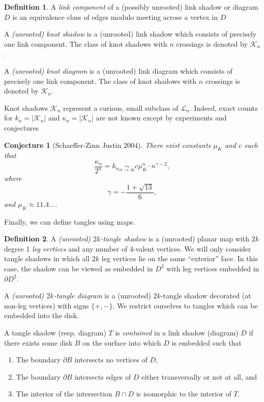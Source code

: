 \documentclass[amsmath,longbibliography,secnumarabic,floatfix,amssymb,nofootinbib,nobibnotes,letterpaper,11pt,tightenlines,notitlepage,showkeys,showlabels]{amsart}%
\newcommand{\KnotDia}{\mathcal{K}}
\newcommand{\knotdia}{\kappa}
\newcommand{\FlatKnotDia}{\mathscr{K}}
\newcommand{\KnotShad}{\FlatKnotDia}
\newcommand{\knotshad}{k}
\newcommand{\knotgrowth}{\mu_K}
\newcommand{\LinkShad}{\mathscr{L}}
\newtheorem*{conjecture}{Conjecture}
\theoremstyle{definition}
\newtheorem*{definition}{Definition}
\begin{document}
\begin{definition} 
  A \emph{link component} of a (possibly unrooted) link shadow or
  diagram $D$ is an equivalence class of edges modulo meeting across a
  vertex in $D$

  A \emph{(unrooted) knot shadow} is a (unrooted) link shadow which
  consists of precisely one link component. The class of knot
  shadows with $n$ crossings is denoted by $\KnotShad_n$.

  A \emph{(unrooted) knot diagram} is a (unrooted) link diagram which
  consists of precisely one link component. The class of knot
  shadows with $n$ crossings is denoted by $\KnotDia_n$.
\end{definition} 

Knot shadows $\KnotShad_n$ represent a curious, small
subclass of $\LinkShad_n$. Indeed, exact counts for $\knotshad_n =
|\KnotShad_n|$ and $\knotdia_n = |\KnotDia_n|$ are
not known except by experiments and conjectures\cite{PZJasympconj2004}

\begin{conjecture}[Schaeffer-Zinn Justin 2004]
  There exist constants $\knotgrowth$ and $c$ such that
  \[\frac{\knotdia_n}{2^n} = \knotshad_n \mathop{\sim}\limits_{n \to \infty} c\knotgrowth^n \cdot
  n^{\gamma - 2},\]
  where 
  \[\gamma = -\frac{1 + \sqrt{13}}{6},\]
  and $\knotgrowth \approx 11.4...$.
\end{conjecture}

Finally, we can define tangles using maps.

\begin{definition}
  A \emph{(unrooted) $2k$-tangle shadow} is a (unrooted) planar map
  with $2k$ degree 1 \emph{leg vertices} and any number of 4-valent vertices. We
  will only consider tangle shadows in which all $2k$ leg vertices lie
  on the same ``exterior'' face. In this case, the shadow can be
  viewed as embedded in $D^2$ with leg vertices embedded in $\partial
  D^2$.

  A \emph{(unrooted) $2k$-tangle diagram} is a (unrooted) $2k$-tangle
  shadow decorated (at non-leg vertices) with signs $\{+,-\}$. We
  restrict ourselves to tangles which can be embedded into the disk.

  A tangle shadow (resp. diagram) $T$ is \emph{contained} in a link shadow
  (diagram) $D$ if there exists some disk $B$ on the surface into
  which $D$ is embedded such that
  \begin{enumerate}
  \item The boundary $\partial B$ intersects no vertices of $D$,
  \item The boundary $\partial B$ intersects edges of $D$ either
    transversally or not at all, and
  \item The interior of the intersection $B \cap D$ is isomorphic to
    the interior of $T$.
  \end{enumerate}
\end{definition}
\end{document}
